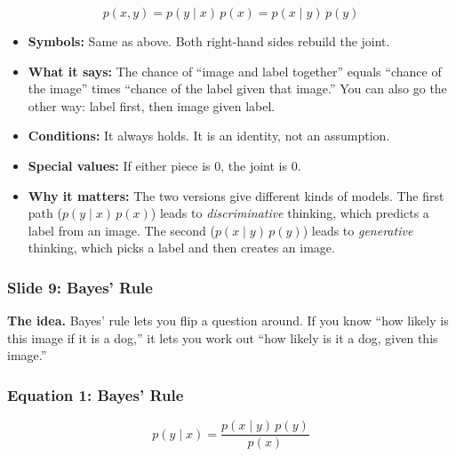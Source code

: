 \[
p(x, y) = p(y \mid x)\, p(x) = p(x \mid y)\, p(y)
\]

\begin{itemize}
  \item \textbf{Symbols:} Same as above. Both right-hand sides rebuild the joint.
  \item \textbf{What it says:} The chance of ``image and label together'' equals ``chance of the image'' times ``chance of the label given that image.'' You can also go the other way: label first, then image given label.
  \item \textbf{Conditions:} It always holds. It is an identity, not an assumption.
  \item \textbf{Special values:} If either piece is 0, the joint is 0.
  \item \textbf{Why it matters:} The two versions give different kinds of models. The first path ($p(y \mid x)\, p(x)$) leads to \textit{discriminative} thinking, which predicts a label from an image. The second ($p(x \mid y)\, p(y)$) leads to \textit{generative} thinking, which picks a label and then creates an image.
\end{itemize}

\subsubsection*{Slide 9: Bayes' Rule}

\textbf{The idea.} Bayes' rule lets you flip a question around. If you know ``how likely is this image if it is a dog,'' it lets you work out ``how likely is it a dog, given this image.''

\subsubsection*{Equation 1: Bayes' Rule}

\[
p(y \mid x) = \frac{p(x \mid y)\, p(y)}{p(x)}
\]

